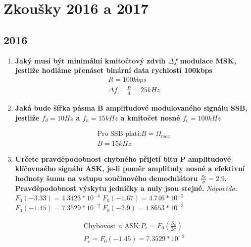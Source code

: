 \section{Zkoušky 2016 a 2017}
\subsection{2016}
\begin{enumerate}
    \item \textbf{Jaký musí být minimální kmitočtový zdvih $\Delta f$ modulace MSK, jestliže hodláme přenáset binární data rychlostí 100kbps}
    \begin{gather*}
        R=100 kbps \\
        \Delta f=\frac{R}{4}=25kHz
    \end{gather*}
    \item \textbf{Jaká bude šířka pásma B amplitudové modulovaného signálu SSB,  jestliže $f_d=10Hz$ a $f_h=15kHz$ a kmitočet nosné $f_c=100kHz$}

    \begin{gather*}
        \textrm{Pro SSB platí:} B = \Omega_{max} \\
        B=15kHz
    \end{gather*}
    
    \item \textbf{Určete pravděpodobnost chybného přijetí bitu P amplitudově klíčovnaého signálu ASK, je-li poměr amplitudy nosné a efektivní hodnoty šumu na vstupu součinového demodulátoru $\frac{Sc}{\sigma}=2.9$. Pravděpodobnost výskytu jedničky a nuly jsou stejné.}
    \textit{Nápověda:}
    \textit{$F_0(-3.33)=4.3423*10^{-4}$}
    \textit{$F_0(-1.67)=4.746*10^{-2}$}
    \textit{$F_0(-1.45)=7.3529*10^{-2}$}
    \textit{$F_0(-2.9)=1.8653*10^{-3}$}

    \begin{gather*}
        \textrm{Chybovost u ASK:} P_e=F_0(\frac{S_c}{2\sigma}) \\
        P_e=F_0(-1.45)=7.3529*10^{-2}
    \end{gather*}


\end{enumerate}
